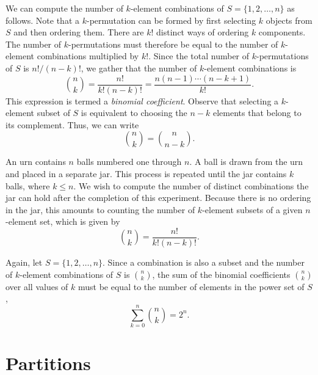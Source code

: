 We can compute the number of $k$-element combinations of $S = \{ 1, 2, \ldots, n \}$ as follows.
Note that a $k$-permutation can be formed by first selecting $k$ objects from $S$ and then ordering them.
There are $k!$ distinct ways of ordering $k$ components.
The number of $k$-permutations must therefore be equal to the number of $k$-element combinations multiplied by $k!$.
Since the total number of $k$-permutations of $S$ is $n! / (n-k)!$, we gather that the number of $k$-element combinations is
\begin{equation*}
\binom{n}{k} = \frac{n!}{k! (n-k)!} = \frac{ n (n-1) \cdots (n-k+1) }{ k! } .
\end{equation*}
This expression is termed a \emph{binomial coefficient}. 
Observe that selecting a $k$-element subset of $S$ is equivalent to choosing the $n-k$ elements that belong to its complement.
Thus, we can write
\begin{equation*}
\binom{n}{k} = \binom{n}{n-k} .
\end{equation*}

\begin{example}
An urn contains $n$ balls numbered one through $n$.
A ball is drawn from the urn and placed in a separate jar.
This process is repeated until the jar contains $k$ balls, where $k \leq n$.
We wish to compute the number of distinct combinations the jar can hold after the completion of this experiment.
Because there is no ordering in the jar, this amounts to counting the number of $k$-element subsets of a given $n$-element set, which is given by
\begin{equation*}
\binom{n}{k} = \frac{n!}{k! (n-k)!}.
\end{equation*}
\end{example}

Again, let $S = \{1, 2, \ldots, n\}$.
Since a combination is also a subset and the number of $k$-element combinations of $S$ is $\binom{n}{k}$, the sum of the binomial coefficients $\binom{n}{k}$ over all values of $k$ must be equal to the number of elements in the power set of $S$, 
\begin{equation*}
\sum_{k=0}^n \binom{n}{k} = 2^n .
\end{equation*}


\section{Partitions}

